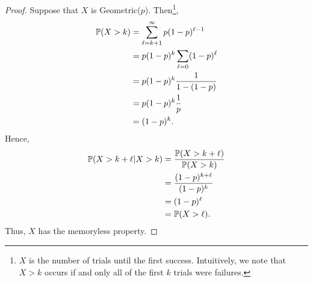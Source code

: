 \documentclass[letterpaper]{article}
\begin{document}
\begin{mdframed}[]
    \begin{proof}
        Suppose that $X$ is Geometric($p$). Then\footnote{$X$ is the number of trials until the first success. Intuitively, we note that $X > k$ occurs if and only all of the first $k$ trials were failures.}, 
        \begin{equation*}
            \begin{aligned}
                \mathbb{P}(X > k) &= \sum_{\ell = k + 1}^{\infty} p(1 - p)^{\ell - 1} \\ 
                    &= p(1 - p)^k \sum_{\ell = 0} (1 - p)^{\ell} \\ 
                    &= p(1 - p)^k \frac{1}{1 - (1 - p)} \\ 
                    &= p(1 - p)^k \frac{1}{p} \\ 
                    &= (1 - p)^k.
            \end{aligned}
        \end{equation*}
        Hence, 
        \begin{equation*}
            \begin{aligned}
                \mathbb{P}(X > k + \ell | X > k) &= \frac{\mathbb{P}(X > k + \ell)}{\mathbb{P}(X > k)} \\ 
                    &= \frac{(1 - p)^{k + \ell}}{(1 - p)^k} \\ 
                    &= (1 - p)^{\ell} \\ 
                    &= \mathbb{P}(X > \ell).
            \end{aligned}
        \end{equation*}
        Thus, $X$ has the memoryless property.
    \end{proof}
\end{mdframed}
\end{document}
